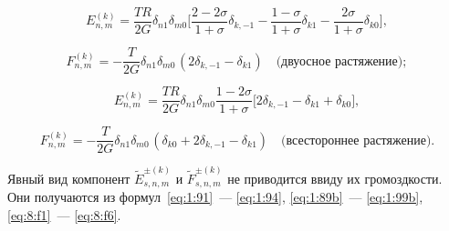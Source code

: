 \begin{russian}
\begin{equation*}
E_{n,m}^{(k)} =\frac{TR}{2G}\delta_{n1}\delta_{m0}\bigg[\frac{2-2\sigma}{1+\sigma}\delta_{k,-1}-\frac{1-\sigma}{1+\sigma}\delta_{k1}-\frac{2\sigma}{1+\sigma}\delta_{k0}\bigg],
\label{eq:11:20a}
\end{equation*}

\begin{equation*}
F_{n,m}^{(k)} =  -\frac{T}{2G}{\delta _{n1}}{\delta _{m0\,}}(2{\delta _{k, - 1}} - {\delta _{k1}})\quad\text{(двуосное растяжение)};
\label{eq:11:20}
\end{equation*}

\begin{equation*}
E_{n,m}^{(k)} =\frac{TR}{2G}\delta_{n1}\delta_{m0}\frac{1-2\sigma}{1+\sigma}\bigg[2\delta_{k,-1}-\delta_{k1}+\delta_{k0}\bigg],
\label{eq:11:21a}
\end{equation*}

\begin{equation*}
F_{n,m}^{(k)} =  -\frac{T}{2G}{\delta _{n1}}{\delta _{m0\,}}(\delta_{k0}+2{\delta _{k, - 1}} - {\delta _{k1}})\quad\text{(всестороннее растяжение)}.
\label{eq:11:21}
\end{equation*}

Явный вид компонент $\tilde E_{s,n,m}^{\pm(k)}$ и $\tilde F_{s,n,m}^{\pm(k)}$ не приводится ввиду их громоздкости. Они получаются из формул~\eqref{eq:1:91}~--- \eqref{eq:1:94}, \eqref{eq:1:89b}~--- \eqref{eq:1:99b}, \eqref{eq:8:f1}~--- \eqref{eq:8:f6}.


\end{russian}
